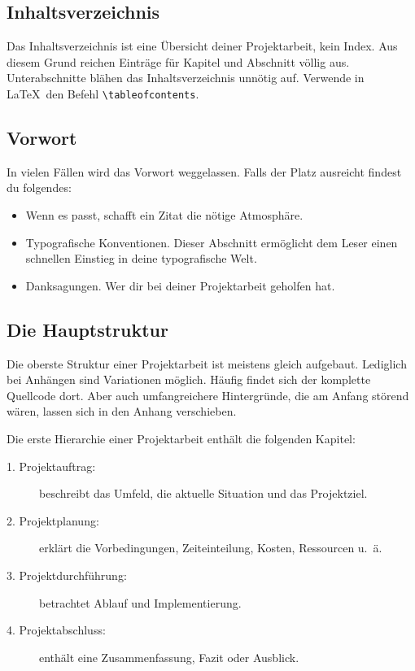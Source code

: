 \documentclass[a4paper,titlepage=true,twoside]{scrartcl}
\newcommand{\gquote}[1]{\glqq #1\grqq}
\begin{document}
\subsection{Inhaltsverzeichnis}
Das Inhaltsverzeichnis ist eine Übersicht deiner Projektarbeit, kein Index.
Aus diesem Grund reichen Einträge für Kapitel und Abschnitt völlig aus.
Unterabschnitte blähen das Inhaltsverzeichnis unnötig auf.
Verwende in \LaTeX\ den Befehl \verb!\tableofcontents!.





\subsection{Vorwort}
In vielen Fällen wird das Vorwort weggelassen. Falls der Platz ausreicht
findest du folgendes:

\begin{itemize}
 \item Wenn es passt, schafft ein Zitat die nötige Atmosphäre.
 \item Typografische Konventionen. Dieser Abschnitt ermöglicht dem Leser
  einen schnellen Einstieg in deine \gquote{typografische Welt}. 
 \item Danksagungen. Wer dir bei deiner Projektarbeit geholfen hat.
\end{itemize}



\subsection{Die Hauptstruktur}
Die oberste Struktur einer Projektarbeit ist meistens gleich aufgebaut. 
Lediglich bei Anhängen sind Variationen möglich. Häufig findet sich der 
komplette Quellcode dort. Aber auch umfangreichere Hintergründe, die 
am Anfang störend wären, lassen sich in den Anhang verschieben.

Die erste Hierarchie einer Projektarbeit enthält die folgenden Kapitel:

\begin{description}
 \item[1. Projektauftrag:] beschreibt das Umfeld, die aktuelle Situation und das Projektziel.
 \item[2. Projektplanung:] erklärt die Vorbedingungen, Zeiteinteilung, Kosten, Ressourcen u.~ä.
 \item[3. Projektdurchführung:] betrachtet Ablauf und Implementierung.
 \item[4. Projektabschluss:] enthält eine Zusammenfassung, Fazit oder Ausblick.
\end{description}
\end{document}
